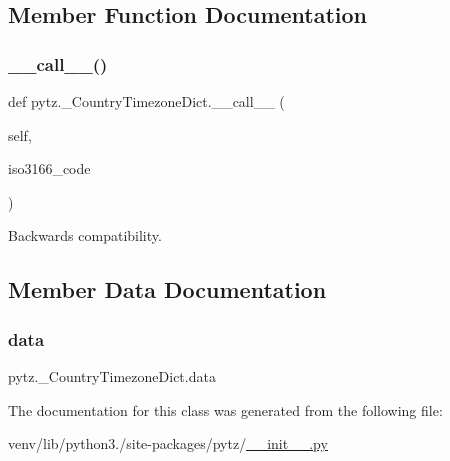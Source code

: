 \subsection{Member Function Documentation}
\mbox{\label{classpytz_1_1__CountryTimezoneDict_ad7a167f353935da067e3e0e282315023}} 
\subsubsection{\texorpdfstring{\+\_\+\+\_\+call\+\_\+\+\_\+()}{\_\_call\_\_()}}
{\footnotesize\ttfamily def pytz.\+\_\+\+Country\+Timezone\+Dict.\+\_\+\+\_\+call\+\_\+\+\_\+ (\begin{DoxyParamCaption}\item[{}]{self,  }\item[{}]{iso3166\+\_\+code }\end{DoxyParamCaption})}

\begin{DoxyVerb}Backwards compatibility.\end{DoxyVerb}
 

\subsection{Member Data Documentation}
\mbox{\label{classpytz_1_1__CountryTimezoneDict_aab65f54e51e998a7d9142b38c005cf1c}} 
\subsubsection{\texorpdfstring{data}{data}}
{\footnotesize\ttfamily pytz.\+\_\+\+Country\+Timezone\+Dict.\+data}



The documentation for this class was generated from the following file\+:\begin{DoxyCompactItemize}
\item 
venv/lib/python3./site-\/packages/pytz/\hyperlink{venv_2lib_2python3_89_2site-packages_2pytz_2____init_____8py}{\+\_\+\+\_\+init\+\_\+\+\_\+.\+py}\end{DoxyCompactItemize}
